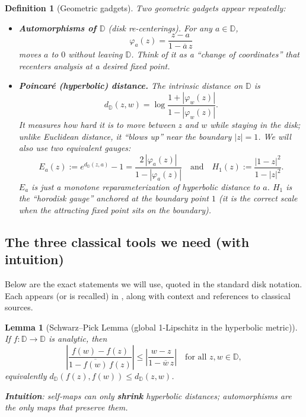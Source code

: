 \documentclass[11pt]{article}
\newtheorem{lemma}{Lemma}
\newtheorem{definition}{Definition}
\begin{document}
\begin{definition}[Geometric gadgets]
Two geometric gadgets appear repeatedly:

\begin{itemize}
\item \textbf{Automorphisms of $\mathbb{D}$} (disk re-centerings). For any $a\in\mathbb{D}$,
\begin{equation}
\varphi_a(z) = \frac{z-a}{1-\overline{a}\,z}
\end{equation}
moves $a$ to $0$ without leaving $\mathbb{D}$. Think of it as a ``change of coordinates'' that recenters analysis at a desired fixed point.

\item \textbf{Poincaré (hyperbolic) distance.} The intrinsic distance on $\mathbb{D}$ is
\begin{equation}
d_{\mathbb{D}}(z,w) = \log\frac{1+|\varphi_w(z)|}{1-|\varphi_w(z)|}.
\end{equation}
It measures how hard it is to move between $z$ and $w$ while staying in the disk; unlike Euclidean distance, it ``blows up'' near the boundary $|z|=1$. We will also use two equivalent gauges:
\begin{equation}
E_a(z) := e^{d_{\mathbb{D}}(z,a)}-1 = \frac{2\,|\varphi_a(z)|}{1-|\varphi_a(z)|} \quad\text{and}\quad
H_1(z) := \frac{|1-z|^2}{1-|z|^2}.
\end{equation}
$E_a$ is just a monotone reparameterization of hyperbolic distance to $a$. $H_1$ is the ``horodisk gauge'' anchored at the boundary point $1$ (it is the correct scale when the attracting fixed point sits on the boundary).
\end{itemize}
\end{definition}

\subsection{The three classical tools we need (with intuition)}

Below are the exact statements we will use, quoted in the standard disk notation. Each appears (or is recalled) in \cite{mercer2018}, along with context and references to classical sources.

\begin{lemma}[Schwarz–Pick Lemma (global 1-Lipschitz in the hyperbolic metric)]
If $f:\mathbb{D}\to\mathbb{D}$ is analytic, then
\begin{equation}
\left|\frac{f(w)-f(z)}{1-\overline{f(w)}\,f(z)}\right| \leq \left|\frac{w-z}{1-\overline{w}\,z}\right|
\quad\text{for all }z,w\in\mathbb{D},
\end{equation}
equivalently $d_{\mathbb{D}}(f(z),f(w))\leq d_{\mathbb{D}}(z,w)$. 

\textbf{Intuition}: self-maps can only \textbf{shrink} hyperbolic distances; automorphisms are the only maps that preserve them.
\end{lemma}
\end{document}
